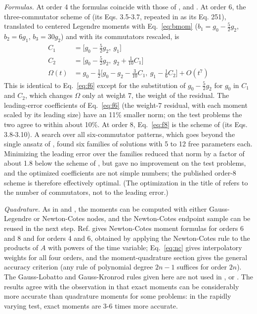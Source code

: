 \documentclass[12pt]{article}
\begin{document}
\emph{Formulas.} At order 4 the formulas coincide with those of \cite{bcr2000}, \cite{bcr2002} and \cite{bcor2009}. At order 6, the three-commutator scheme of \cite{bcr2002} (its Eqs. 3.5-3.7, repeated in \cite{bcor2009} as its Eq. 251), translated to centered Legendre moments with Eq.~\ref{eq:bmom} ($b_1=g_0-\frac{5}{2}g_2$, $b_2=6g_1$, $b_3=30g_2$) and with its commutators rescaled, is
\begin{equation}
\begin{aligned}
C_{1}&=\big[g_{0}-\tfrac{5}{2}g_{2},\ g_{1}\big]\\
C_{2}&=\big[g_{0}-\tfrac{5}{2}g_{2},\ g_{2}+\tfrac{1}{10}C_{1}\big]\\
\Omega(t)&=g_{0}-\tfrac{1}{2}\big[g_{0}-g_{2}-\tfrac{3}{10}C_{1},\ g_{1}-\tfrac{1}{6}C_{2}\big]+O(t^{7})
\end{aligned}\label{eq:bcr6}
\end{equation}
This is identical to Eq.~\ref{eq:f6} except for the substitution of $g_0-\frac{5}{2}g_2$ for $g_0$ in $C_1$ and $C_2$, which changes $\Omega$ only at weight 7, the weight of the residual. The leading-error coefficients of Eq.~\ref{eq:f6} (the weight-7 residual, with each moment scaled by its leading size) have an 11\% smaller norm; on the test problems the two agree to within about 10\%. At order 8, Eq.~\ref{eq:f8} is the scheme of \cite{bcr2002} (its Eqs. 3.8-3.10). A search over all six-commutator patterns, which goes beyond the single ansatz of \cite{bcr2002}, found six families of solutions with 5 to 12 free parameters each. Minimizing the leading error over the families reduced that norm by a factor of about 1.8 below the scheme of \cite{bcr2002}, but gave no improvement on the test problems, and the optimized coefficients are not simple numbers; the published order-8 scheme is therefore effectively optimal. (The optimization in the title of \cite{bcr2002} refers to the number of commutators, not to the leading error.)

\emph{Quadrature.} As in \cite{bcr2000} and \cite{bcor2009}, the moments can be computed with either Gauss-Legendre or Newton-Cotes nodes, and the Newton-Cotes endpoint sample can be reused in the next step. Ref. \cite{bcr2000} gives Newton-Cotes moment formulas for orders 6 and 8 and \cite{bcor2009} for orders 4 and 6, obtained by applying the Newton-Cotes rule to the products of $A$ with powers of the time variable; Eq.~\ref{eq:nc} gives interpolatory weights for all four orders, and the moment-quadrature section gives the general accuracy criterion (any rule of polynomial degree $2n-1$ suffices for order $2n$). The Gauss-Lobatto and Gauss-Kronrod rules given here are not used in \cite{bcr2000}, \cite{bcr2002} or \cite{bcor2009}. The results agree with the observation in \cite{bcr2002} that exact moments can be considerably more accurate than quadrature moments for some problems: in the rapidly varying test, exact moments are 3-6 times more accurate.
\end{document}
